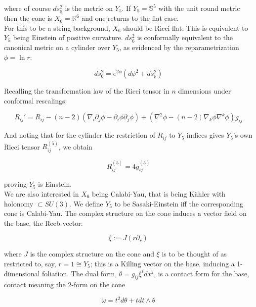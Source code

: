 where of course $ds_5^2$ is the metric on $Y_5$. If $Y_5 = \mathbb{S}^5$ with the unit round metric then the cone is $X_6 = \mathbb{R}^6$ and one returns to the flat case.\\

For this to be a string background, $X_6$ should be Ricci-flat. This is equivalent to $Y_5$ being Einstein of positive curvature. $ds_6^2$ is conformally equivalent to the canonical metric on a cylinder over $Y_5$, as evidenced by the reparametrization $\phi = \ln r$:

\begin{equation}
	ds_6^2 = e^{2\phi} \left( d\phi^2 + ds_5^2 \right)
\end{equation}

Recalling the transformation law of the Ricci tensor in $n$ dimensions under conformal rescalings:

\begin{equation}
	R_{ij}' = R_{ij} - (n-2)\left( \nabla_i \partial_j \phi - \partial_i \phi \partial_j \phi \right) + \left( \nabla^2 \phi - (n-2) \nabla_k \phi \nabla^k \phi \right) g_{ij}
\end{equation}

And noting that for the cylinder the restriction of $R_{ij}$ to $Y_5$ indices gives $Y_5$'s own Ricci tensor $R_{ij}^{(5)}$, we obtain

\begin{equation}
	R^{(5)}_{ij} = 4 g_{ij}^{(5)}
\end{equation}

proving $Y_5$ is Einstein.\\

We are also interested in $X_6$ being Calabi-Yau, that is being K\"ahler with holonomy $\subset SU(3)$. We define $Y_5$ to be Sasaki-Einstein iff the corresponding cone is Calabi-Yau. The complex structure on the cone induces a vector field on the base, the Reeb vector:%

\begin{equation}
	\xi := J (r \partial_r)
\end{equation}

where $J$ is the complex structure on the cone and $\xi$ is to be thought of as restricted to, say, ${r=1} \cong Y_5$; this is a Killing vector on the base, inducing a 1-dimensional foliation. The dual form, $\theta = g_{ij} \xi^i dx^j$, is a contact form for the base, contact meaning the 2-form on the cone

\begin{equation}
	\omega = t^2 d\theta + t dt \wedge \theta
\end{equation}


